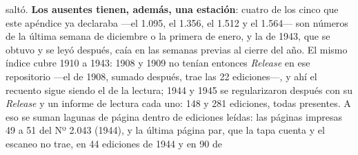 saltó. \textbf{Los ausentes tienen, además, una estación}: cuatro de los cinco que este apéndice ya
declaraba ---el 1.095, el 1.356, el 1.512 y el 1.564--- son números de la última semana de
diciembre o la primera de enero, y la de 1943, que se obtuvo y se leyó después, caía en las semanas previas al cierre del
año. El mismo índice cubre 1910 a 1943: 1908 y 1909 no tenían entonces \textit{Release} en
ese repositorio ---el de 1908, sumado después, trae las 22 ediciones---, y ahí el recuento sigue siendo el de la lectura; 1944 y 1945 se regularizaron después con su \textit{Release} y un informe de lectura cada uno: 148 y 281 ediciones, todas presentes. A eso se suman lagunas de página dentro de ediciones leídas: las páginas
impresas 49 a 51 del Nº 2.043 (1944), y la última página par, que la tapa cuenta y el escaneo no trae, en 44 ediciones de 1944 y en 90 de

